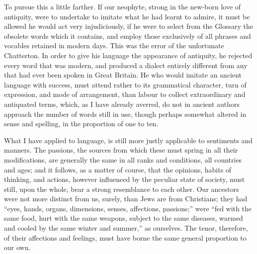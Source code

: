 To pursue this a little farther. If our neophyte, strong in the new-born
love of antiquity, were to undertake to imitate what he had learnt to
admire, it must be allowed he would act very injudiciously, if he were
to select from the Glossary the obsolete words which it contains, and
employ those exclusively of all phrases and vocables retained in modern
days. This was the error of the unfortunate Chatterton. In order to give
his language the appearance of antiquity, he rejected every word that
was modern, and produced a dialect entirely different from any that had
ever been spoken in Great Britain. He who would imitate an ancient
language with success, must attend rather to its grammatical character,
turn of expression, and mode of arrangement, than labour to collect
extraordinary and antiquated terms, which, as I have already averred, do
not in ancient authors approach the number of words still in use, though
perhaps somewhat altered in sense and spelling, in the proportion of one
to ten.

What I have applied to language, is still more justly applicable to
sentiments and manners. The passions, the sources from which these must
spring in all their modifications, are generally the same in all ranks
and conditions, all countries and ages; and it follows, as a matter of
course, that the opinions, habits of thinking, and actions, however
influenced by the peculiar state of society, must still, upon the whole,
bear a strong resemblance to each other. Our ancestors were not more
distinct from us, surely, than Jews are from Christians; they had
``eyes, hands, organs, dimensions, senses, affections, passions;'' were
``fed with the same food, hurt with the same weapons, subject to the
same diseases, warmed and cooled by the same winter and summer,'' as
ourselves. The tenor, therefore, of their affections and feelings, must
have borne the same general proportion to our own.


